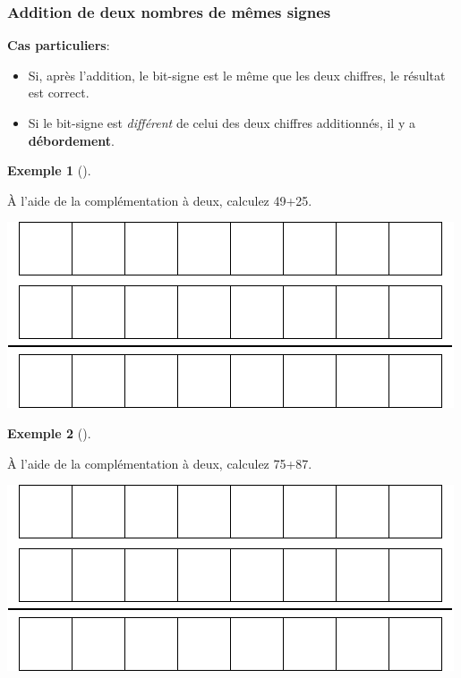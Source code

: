 \documentclass[
  letterpaper,
]{scrbook}
\providecommand{\tightlist}{%
  \setlength{\itemsep}{0pt}\setlength{\parskip}{0pt}}\usepackage{longtable,booktabs,array}
\theoremstyle{definition}
\newtheorem{example}{Exemple}[chapter]
\theoremstyle{definition}
\theoremstyle{plain}
\theoremstyle{remark}
\begin{document}
\hypertarget{addition-de-deux-nombres-de-muxeames-signes}{%
\subsubsection*{Addition de deux nombres de mêmes
signes}\label{addition-de-deux-nombres-de-muxeames-signes}}

\textbf{Cas particuliers}:

\begin{itemize}
\tightlist
\item
  Si, après l'addition, le bit-signe est le même que les deux chiffres,
  le résultat est correct.
\item
  Si le bit-signe est \emph{différent} de celui des deux chiffres
  additionnés, il y a \textbf{débordement}.
\end{itemize}

\leavevmode{}%
\begin{example}[]\label{exm-addition-complement-deux-1}

À l'aide de la complémentation à deux, calculez 49+25.

\includegraphics{./systeme_numeration_files/figure-pdf/unnamed-chunk-8-1.pdf}

\end{example}

\leavevmode{}%
\begin{example}[]\label{exm-addition-complement-deux-2}

À l'aide de la complémentation à deux, calculez 75+87.

\includegraphics{./systeme_numeration_files/figure-pdf/unnamed-chunk-9-1.pdf}

\end{example}
\end{document}
